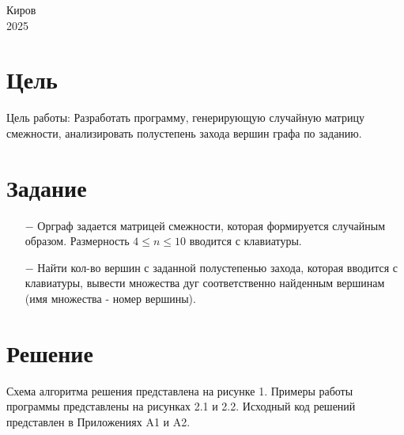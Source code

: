 \documentclass[oneside,a4paper,14pt]{extarticle}
\begin{document}
\begin{center}
	Киров\\
	2025
\end{center}

\newpage\thispagestyle{plain}

\section*{Цель}

Цель работы: Разработать программу, генерирующую случайную матрицу смежности, анализировать полустепень захода вершин графа по заданию.

\section*{Задание}
\begin{itemize}
	\item[$-$] Орграф задается матрицей смежности, которая формируется случайным образом. Размерность $ 4 \leq n \leq 10 $ вводится с клавиатуры.
  \item[$-$] Найти кол-во вершин с заданной полустепенью захода, которая вводится с клавиатуры, вывести множества дуг соответственно найденным вершинам (имя множества - номер вершины).
\end{itemize}
\section*{Решение}

Схема алгоритма решения представлена на рисунке 1. Примеры работы программы представлены на рисунках 2.1 и 2.2. Исходный код решений представлен в Приложениях A1 и A2.
\end{document}
